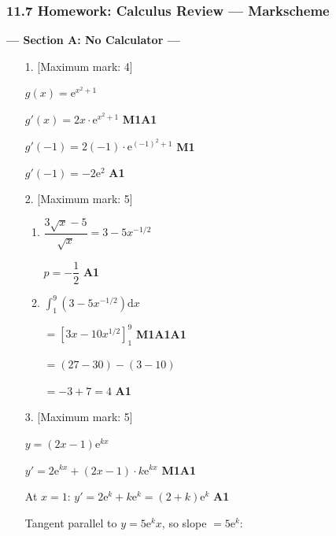 \documentclass[12pt, twoside]{article}
\begin{document}
\subsubsection*{11.7 Homework: Calculus Review --- Markscheme}

\begin{center}\textbf{--- Section A: No Calculator ---}\end{center}

\begin{enumerate}[itemsep=0.15cm]

\item[1.] [Maximum mark: 4]

$g(x) = \mathrm{e}^{x^{2}+1}$

$g'(x) = 2x \cdot \mathrm{e}^{x^{2}+1}$ \hfill \textbf{M1A1}

$g'(-1) = 2(-1) \cdot \mathrm{e}^{(-1)^{2}+1}$ \hfill \textbf{M1}

$g'(-1) = -2\mathrm{e}^{2}$ \hfill \textbf{A1}

\bigskip

\item[2.] [Maximum mark: 5]

\begin{enumerate}
  \item $\dfrac{3\sqrt{x}-5}{\sqrt{x}} = 3 - 5x^{-1/2}$

  $p = -\dfrac{1}{2}$ \hfill \textbf{A1}

  \item $\displaystyle\int_{1}^{9}\!\left(3 - 5x^{-1/2}\right)\mathrm{d}x$

  $= \left[3x - 10x^{1/2}\right]_{1}^{9}$ \hfill \textbf{M1A1A1}

  $= (27 - 30) - (3 - 10)$

  $= -3 + 7 = 4$ \hfill \textbf{A1}
\end{enumerate}

\bigskip

\item[3.] [Maximum mark: 5]

$y = (2x-1)\mathrm{e}^{kx}$

$y' = 2\mathrm{e}^{kx} + (2x-1) \cdot k\mathrm{e}^{kx}$ \hfill \textbf{M1A1}

At $x = 1$: $y' = 2\mathrm{e}^{k} + k\mathrm{e}^{k} = (2+k)\mathrm{e}^{k}$ \hfill \textbf{A1}

Tangent parallel to $y = 5\mathrm{e}^{k}x$, so slope $= 5\mathrm{e}^{k}$:


\end{enumerate}
\end{document}
